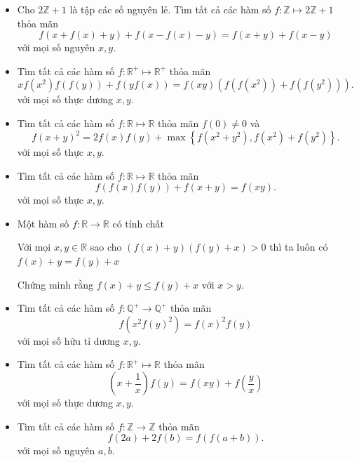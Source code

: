 \documentclass[11pt]{scrartcl}
\begin{document}
\begin{itemize}[label=, leftmargin=0em, itemsep=-0em]
    \item \begin{btvn}
        Cho $2\mathbb{Z} + 1$ là tập các số nguyên lẻ. Tìm tất cả các hàm số $f : \mathbb{Z} \mapsto 2\mathbb{Z} + 1$ thỏa mãn
        \[ f(x + f(x) + y) + f(x - f(x) - y) = f(x+y) + f(x-y) \]
        với mọi số nguyên $x,y$.
    \end{btvn}
    \item \begin{btvn}
        Tìm tất cả các hàm số $f : \mathbb{R}^+ \mapsto \mathbb{R}^+$ thỏa mãn
        $$xf(x^2)f(f(y)) + f(yf(x)) = f(xy) \left(f(f(x^2)) + f(f(y^2))\right).$$
        với mọi số thực dương $x,y$.
    \end{btvn}
    \item \begin{btvn}
        Tìm tất cả các hàm số $f : \mathbb{R} \mapsto \mathbb{R}$ thỏa mãn $f(0)\neq 0$ và
        \[ f(x+y)^2 = 2f(x)f(y) + \max \left\{ f(x^2+y^2), f(x^2)+f(y^2) \right\}. \]
        với mọi số thực $x,y$.
    \end{btvn}
    \item \begin{btvn}
        Tìm tất cả các hàm số $f : \mathbb{R} \mapsto \mathbb{R}$ thỏa mãn
        \[ f(f(x)f(y)) + f(x+y) = f(xy). \]
        với mọi số thực $x,y$.
    \end{btvn}

    \item \begin{btvn}
        Một hàm số $f: \mathbb{R} \to \mathbb{R}$ có tính chất 

        Với mọi $x,y \in \mathbb{R}$ sao cho $(f(x)+y)(f(y)+x) > 0$ thì ta luôn có $f(x)+y = f(y)+x$

        Chứng minh rằng $f(x)+y \leq f(y)+x$ với $x > y$.
    \end{btvn}

    \item \begin{btvn}
        Tìm tất cả các hàm số $f: \mathbb{Q}^+ \to \mathbb{Q}^+$ thỏa mãn
        $$f(x^2f(y)^2)=f(x)^2f(y)$$
        với mọi số hữu tỉ dương $x,y$.
    \end{btvn}

    \item \begin{btvn}
        Tìm tất cả các hàm số $f : \mathbb{R}^+ \mapsto \mathbb{R}$ thỏa mãn
        $$\left(x+\frac{1}{x}\right)f(y)=f(xy)+f\left(\frac{y}{x}\right)$$
        với mọi số thực dương $x,y$.
    \end{btvn}
    \item \begin{btvn}
        Tìm tất cả các hàm số $f: \mathbb{Z} \to \mathbb{Z}$ thỏa mãn
        $$f(2a)+2f(b)=f(f(a+b)).$$
        với mọi số nguyên $a,b$.
    \end{btvn}


\end{itemize}
\end{document}
